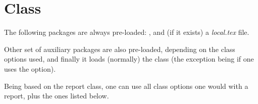 \documentclass[article,nogeometry,english,tocdepth=3,secdepth=3]{ufrgscca} %
\begin{document}
\section{ Class}

The following packages are always pre-loaded: ,  and (if it exists) a \emph{local.tex} file.

Other set of auxiliary packages are also pre-loaded, depending on the class options used, and finally it loads (normally) the  class (the exception being if one uses the  option).

Being based on the report class, one can use all class options one would with a report, plus the ones listed below.
\end{document}
